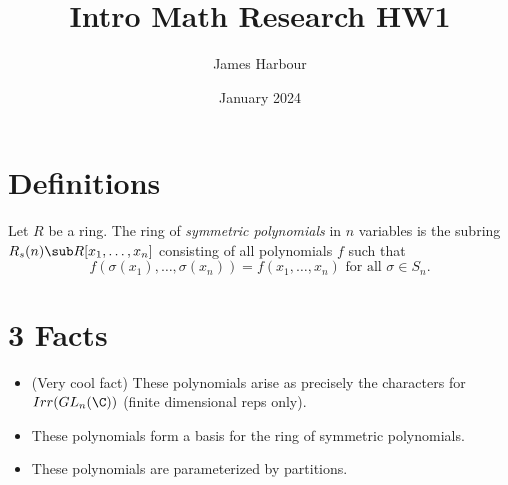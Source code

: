 \documentclass{article}
\title{Intro Math Research HW1}
\author{James Harbour}
\date{January 2024}
\begin{document}
\maketitle

\section{Definitions}

\begin{definition}
    Let $ R $ be a ring. The ring of \textit{symmetric polynomials} in $ n $ variables is the subring $ R_{s}(n)\sub R[x_{1}, \ldots, x_{n}] $ consisting of all polynomials $ f $ such that 
    \[
        f(\sigma(x_{1}),\ldots, \sigma(x_{n})) = f(x_{1},\ldots, x_{n}) \text{ for all } \sigma\in S_{n}.
    \]
\end{definition}

\section*{3 Facts}

\begin{itemize}
    \item (Very cool fact) These polynomials arise as precisely the characters for $ Irr(GL_{n}(\C)) $ (finite dimensional reps only).
    \item These polynomials form a basis for the ring of symmetric polynomials. 
    \item These polynomials are parameterized by partitions.
\end{itemize}
\end{document}
